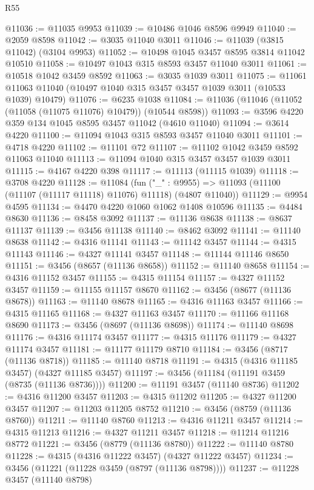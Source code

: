 \begin{lexlean}{R55}
\begin{coremodule}
@11036 := @11035 @9953
@11039 := @10486 @1046 @8596 @9949
@11040 := @2059 @8598
@11042 := @3035 @11040 @3011
@11046 := @11039 (@3815 @11042) (@3104 @9953)
@11052 := @10498 @1045 @3457 @8595 @3814 @11042 @10510
@11058 := @10497 @1043 @315 @8593 @3457 @11040 @3011
@11061 := @10518 @1042 @3459 @8592
@11063 := @3035 @1039 @3011
@11075 := @11061 @11063 @11040 (@10497 @1040 @315 @3457 @3457 @1039 @3011 (@10533 @1039) @10479)
@11076 := @6235 @1038
@11084 := @11036 (@11046 (@11052 (@11058 (@11075 @11076) @10479)) (@10544 @8598))
@11093 := @3596 @4220 @359 @134 @1045 @8595 @3457 @11042 (@4610 @11040)
@11094 := @3614 @4220
@11100 := @11094 @1043 @315 @8593 @3457 @11040 @3011
@11101 := @4718 @4220
@11102 := @11101 @72
@11107 := @11102 @1042 @3459 @8592 @11063 @11040
@11113 := @11094 @1040 @315 @3457 @3457 @1039 @3011
@11115 := @4167 @4220 @398
@11117 := @11113 (@11115 @1039)
@11118 := @3708 @4220
@11128 := @11084
    (fun ("_" : @9955) => @11093 (@11100 (@11107 (@11117 @11118) @11076) @11118) (@4807 @11040))
@11129 := @9954 @4595
@11134 := @4470 @4220 @1060 @1062 @1408 @10596
@11135 := @4484 @8630
@11136 := @8458 @3092
@11137 := @11136 @8638
@11138 := @8637 @11137
@11139 := @3456 @11138
@11140 := @8462 @3092
@11141 := @11140 @8638
@11142 := @4316 @11141
@11143 := @11142 @3457
@11144 := @4315 @11143
@11146 := @4327 @11141 @3457
@11148 := @11144 @11146 @8650
@11151 := @3456 (@8657 (@11136 @8658))
@11152 := @11140 @8658
@11154 := @4316 @11152 @3457
@11155 := @4315 @11154
@11157 := @4327 @11152 @3457
@11159 := @11155 @11157 @8670
@11162 := @3456 (@8677 (@11136 @8678))
@11163 := @11140 @8678
@11165 := @4316 @11163 @3457
@11166 := @4315 @11165
@11168 := @4327 @11163 @3457
@11170 := @11166 @11168 @8690
@11173 := @3456 (@8697 (@11136 @8698))
@11174 := @11140 @8698
@11176 := @4316 @11174 @3457
@11177 := @4315 @11176
@11179 := @4327 @11174 @3457
@11181 := @11177 @11179 @8710
@11184 := @3456 (@8717 (@11136 @8718))
@11185 := @11140 @8718
@11191 := @4315 (@4316 @11185 @3457) (@4327 @11185 @3457)
@11197 := @3456 (@11184 (@11191 @3459 (@8735 (@11136 @8736))))
@11200 := @11191 @3457 (@11140 @8736)
@11202 := @4316 @11200 @3457
@11203 := @4315 @11202
@11205 := @4327 @11200 @3457
@11207 := @11203 @11205 @8752
@11210 := @3456 (@8759 (@11136 @8760))
@11211 := @11140 @8760
@11213 := @4316 @11211 @3457
@11214 := @4315 @11213
@11216 := @4327 @11211 @3457
@11218 := @11214 @11216 @8772
@11221 := @3456 (@8779 (@11136 @8780))
@11222 := @11140 @8780
@11228 := @4315 (@4316 @11222 @3457) (@4327 @11222 @3457)
@11234 := @3456 (@11221 (@11228 @3459 (@8797 (@11136 @8798))))
@11237 := @11228 @3457 (@11140 @8798)

\end{coremodule}
\end{lexlean}
